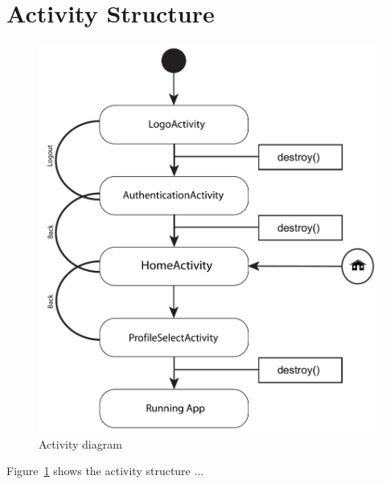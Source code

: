 \section{Activity Structure}


\begin{figure}[h!]
	\centering
	\includegraphics[width=1\textwidth]{gfx/activityDiagram.pdf}
	\caption{Activity diagram}
	\label{fig:activity_diagram}
\end{figure}

Figure~\ref{fig:activity_diagram} shows the activity structure ... 
